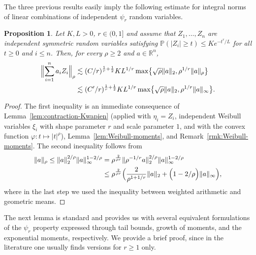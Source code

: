 \documentclass[a4paper]{amsart}
\newtheorem{proposition}[theorem]{Proposition} %
\theoremstyle{definition}
\theoremstyle{remark}
\numberwithin{equation}{section}
\newcommand*{\RR}{\mathbb{R}}
\newcommand*{\PP}{\mathbb{P}}
\newcommand*{\prho}{\rho} %
\begin{document}
The  three previous results easily imply the following estimate for integral norms of linear combinations of independent $\psi_r$ random variables.

\begin{proposition}	\label{prop:psi_prelim4}
	Let $K, L>0$, $r\in(0,1]$ and assume that $Z_1, \dots, Z_n$  are independent  symmetric random variables satisfying $\PP(|Z_i|\ge t) \le Ke^{-t^r/L}$ for all $t\ge 0$ and $i\leq n$. Then, for every $\prho{}\ge 2$ and $a\in \RR^n$,
	\begin{align*}
		\Bigl\| \sum_{i=1}^n a_iZ_i \Bigr\|_{\prho{}}
		& \lesssim (C/r)^{\frac 1r + \frac 12} KL^{1/r}\max\bigl\{ \sqrt{\prho{}} \|a\|_2 , \prho{}^{1/r} \|a\|_{\prho{}} \bigr\}
		\\
		 &\lesssim (C'/r)^{\frac 1r + \frac 12}  KL^{1/r}\max\bigl\{ \sqrt{\prho{}} \|a\|_2 , \prho{}^{1/r} \|a\|_\infty \bigr\}.
	\end{align*}
\end{proposition}


\begin{proof}
	The first inequality is an immediate consequence of Lemma~\ref{lem:contraction-Kwapien}
	(applied with $\eta_i=Z_i$, independent Weibull variables $\xi_i$ with shape parameter $r$ and scale parameter $1$, and with the convex function $\varphi:t\mapsto |t|^{\rho}$),
	Lemma~\ref{lem:Weibull-moments},
	and Remark~\ref{rmk:Weibull-moments}.
	The second inequality follows from
	\begin{align*}
		\|a\|_{\prho{}}\le \|a\|_2^{2/\prho{}}\|a\|_\infty^{1-2/{\prho{}}}
		&= \prho{}^{\frac{2}{\prho{}r}}\|\prho{}^{-1/r}a\|_2^{2/\prho{}}\|a\|_\infty^{1-2/{\prho{}}}
		\\
		&\le {\prho{}}^{\frac 2{\prho{}r}}\Bigl(\frac 2{\prho{}^{1+1/r}} \|a\|_2 + \Bigl(1-2/{\prho{}}\Bigr) \|a\|_\infty \Bigr),
	\end{align*}
	where in the last step we used the inequality between weighted arithmetic and geometric means.
\end{proof}


The next lemma is standard and provides us with several equivalent formulations of the $\psi_r$ property
expressed through tail bounds,
growth of moments,
and the exponential moments, respectively.
We provide a brief proof, since in the literature one usually finds versions  for $r\ge 1$ only.
\end{document}
